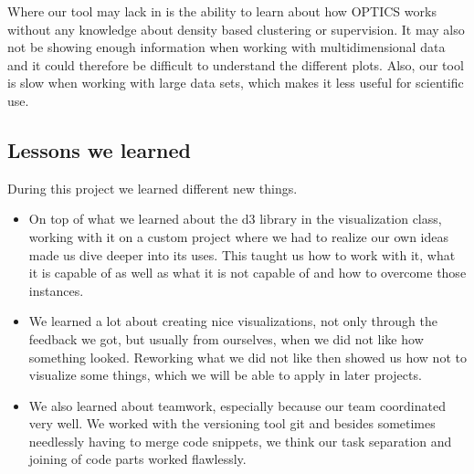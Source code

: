 \documentclass{vgtc} %
\begin{document}
Where our tool may lack in is the ability to learn about how OPTICS works without any knowledge about density based clustering or supervision. It may also not be showing enough information when working with multidimensional data and it could therefore be difficult to understand the different plots. Also, our tool is slow when working with large data sets, which makes it less useful for scientific use.

\subsection{Lessons we learned}

During this project we learned different new things.

\begin{itemize}
\item On top of what we learned about the d3 library in the visualization class, working with it on a custom project where we had to realize our own ideas made us dive deeper into its uses. This taught us how to work with it, what it is capable of as well as what it is not capable of and how to overcome those instances.
\item We learned a lot about creating nice visualizations, not only through the feedback we got, but usually from ourselves, when we did not like how something looked. Reworking what we did not like then showed us how not to visualize some things, which we will be able to apply in later projects.
\item We also learned about teamwork, especially because our team coordinated very well. We worked with the versioning tool git and besides sometimes needlessly having to merge code snippets, we think our task separation and joining of code parts worked flawlessly.
\end{itemize}
\end{document}
